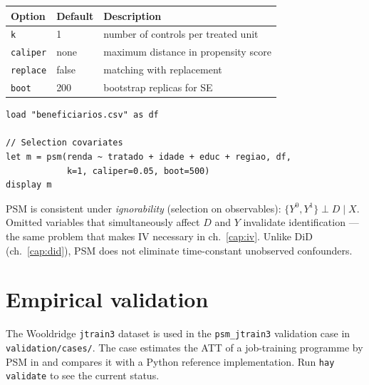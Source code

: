 \begin{center}
\begin{tabular}{lll}
\toprule
\textbf{Option} & \textbf{Default} & \textbf{Description} \\
\midrule
\texttt{k}        & 1       & number of controls per treated unit \\
\texttt{caliper}  & none    & maximum distance in propensity score \\
\texttt{replace}  & false   & matching with replacement \\
\texttt{boot}     & 200     & bootstrap replicas for SE \\
\bottomrule
\end{tabular}
\end{center}

\begin{lstlisting}[caption={Typical workflow — program evaluation}]
load "beneficiarios.csv" as df

// Selection covariates
let m = psm(renda ~ tratado + idade + educ + regiao, df,
            k=1, caliper=0.05, boot=500)
display m
\end{lstlisting}

\begin{nota}
  PSM is consistent under \emph{ignorability} (selection on observables):
  $\{Y^0, Y^1\} \perp D \mid X$. Omitted variables that simultaneously affect
  $D$ and $Y$ invalidate identification — the same problem that makes IV
  necessary in ch.~\ref{cap:iv}. Unlike DiD
  (ch.~\ref{cap:did}), PSM does not eliminate time-constant unobserved confounders.
\end{nota}

\section{Empirical validation}

The Wooldridge \texttt{jtrain3} dataset is used in the \texttt{psm_jtrain3}
validation case in \texttt{validation/cases/}. The case estimates the ATT of
a job-training programme by PSM in \hayashi{} and compares it with a Python
reference implementation. Run \lstinline{hay validate} to see the current
status.
